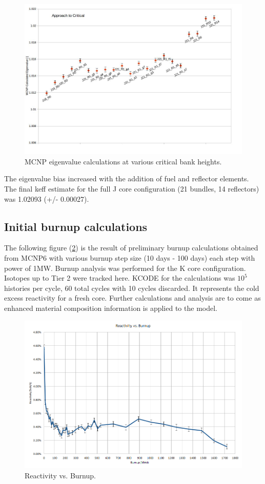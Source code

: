 \documentclass{UWNR_modeling}
\begin{document}
\begin{figure}[t!]
  \centering
  \includegraphics[width=6in]{atc_run_1229.jpg}
  \caption{MCNP eigenvalue calculations at various critical bank heights.}
  \label{fig:atc}
\end{figure}

\noindent
The eigenvalue bias increased with the addition of fuel and reflector elements. The final keff estimate for the full J core configuration (21 bundles, 14 reflectors) was 1.02093 (+/- 0.00027).


\subsection{Initial burnup calculations}
The following figure (\ref{fig:burnup_reactivity}) is the result of preliminary burnup calculations obtained from MCNP6 with various burnup step size (10 days - 100 days) each step with power of 1MW. Burnup analysis was performed for the K core configuration. Isotopes up to Tier 2 were tracked here. KCODE for the calculations was $10^{5}$ histories per cycle, 60 total cycles with 10 cycles discarded. It represents the cold excess reactivity for a fresh core. Further calculations and analysis are to come as enhanced material composition information is applied to the model.
\begin{figure}[H]
  \centering
  \includegraphics[width=6in]{burnup_fig.png}
  \caption{Reactivity vs. Burnup.}
  \label{fig:burnup_reactivity}
\end{figure}
\end{document}
